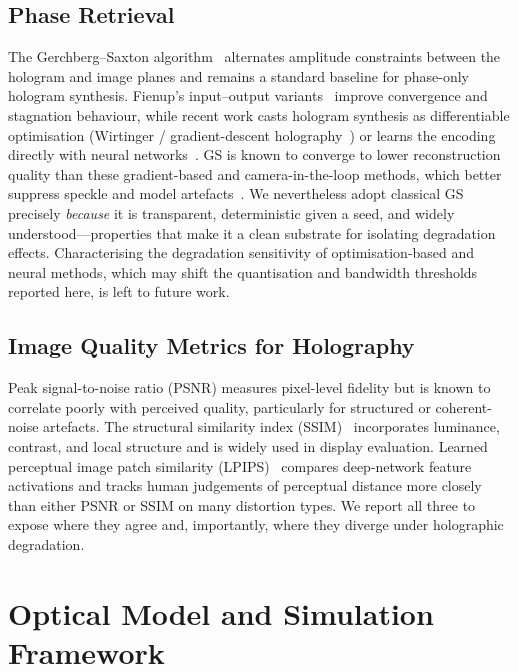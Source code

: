 \documentclass[conference]{IEEEtran}
\begin{document}
\subsection{Phase Retrieval}
The Gerchberg--Saxton algorithm~\cite{gerchberg1972practical} alternates
amplitude constraints between the hologram and image planes and remains a
standard baseline for phase-only hologram synthesis. Fienup's input--output
variants~\cite{fienup1982phase} improve convergence and stagnation behaviour,
while recent work casts hologram synthesis as differentiable optimisation
(Wirtinger / gradient-descent holography~\cite{chakravarthula2019wirtinger}) or
learns the encoding directly with neural
networks~\cite{shi2021towards, peng2020neural}. GS is known to converge to lower
reconstruction quality than these gradient-based and camera-in-the-loop methods,
which better suppress speckle and model artefacts~\cite{peng2020neural}. We
nevertheless adopt classical GS precisely \emph{because} it is transparent,
deterministic given a seed, and widely understood---properties that make it a
clean substrate for isolating degradation effects. Characterising the degradation
sensitivity of optimisation-based and neural methods, which may shift the
quantisation and bandwidth thresholds reported here, is left to future work.

\subsection{Image Quality Metrics for Holography}
Peak signal-to-noise ratio (PSNR) measures pixel-level fidelity but is known to
correlate poorly with perceived quality, particularly for structured or
coherent-noise artefacts. The structural similarity index
(SSIM)~\cite{wang2004image} incorporates luminance, contrast, and local structure
and is widely used in display evaluation. Learned perceptual image patch
similarity (LPIPS)~\cite{zhang2018unreasonable} compares deep-network feature
activations and tracks human judgements of perceptual distance more closely than
either PSNR or SSIM on many distortion types. We report all three to expose where
they agree and, importantly, where they diverge under holographic degradation.

\section{Optical Model and Simulation Framework}
\label{sec:method}
\end{document}
